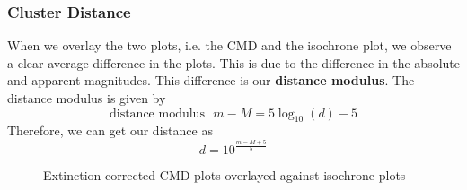 \documentclass[12pt]{article}
\begin{document}
		\subsubsection{Cluster Distance}
		When we overlay the two plots, i.e. the CMD and the isochrone plot, we observe a clear average difference in the plots. This is due to the difference in the absolute and apparent magnitudes. This difference is our \textbf{distance modulus}. The distance modulus is given by
		\[\text{distance modulus} \,\,\,\, m - M = 5\log_{10}(d) - 5\]
		Therefore, we can get our distance as
		\[d = 10^{\frac{m - M + 5}{5}}\]
		\begin{figure}
			\centering
			\qquad
			\caption{Extinction corrected CMD plots overlayed against isochrone plots}
			\label{fig: m7_m54_distance_modulus}
		\end{figure}
\end{document}
